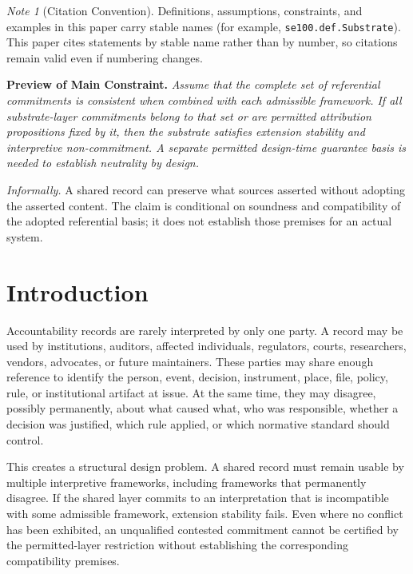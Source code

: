 \documentclass[11pt]{article}
\theoremstyle{plain}
\theoremstyle{definition}
\theoremstyle{remark}
\newtheorem*{note*}{Note}
\begin{document}
\begin{note*}[Citation Convention]
  Definitions, assumptions, constraints, and examples in this paper carry stable
  names (for example, \texttt{se100.def.Substrate}).
  This paper cites statements by stable name rather than by number,
  so citations remain valid even if numbering changes.
\end{note*}


\bigskip
\noindent\textbf{Preview of Main Constraint.}
\emph{
  Assume that the complete set of referential commitments is
  consistent when combined with each admissible framework.
  If all substrate-layer commitments belong to that set or are
  permitted attribution propositions fixed by it, then the
  substrate satisfies extension stability and interpretive
  non-commitment.
  A separate permitted design-time guarantee basis is needed
  to establish neutrality by design.
}

\medskip
\noindent
\emph{Informally.} A shared record can preserve what sources asserted
without adopting the asserted content.
The claim is conditional on soundness and compatibility
of the adopted referential basis;
it does not establish those premises for an actual system.

\section{Introduction}
\label{sec:introduction}

Accountability records are rarely interpreted by only one party.
A record may be used by institutions, auditors, affected individuals,
regulators, courts, researchers, vendors, advocates, or future maintainers.
These parties may share enough reference to identify
the person, event, decision, instrument, place, file, policy, rule,
or institutional artifact at issue.
At the same time, they may disagree, possibly permanently,
about what caused what, who was responsible,
whether a decision was justified, which rule applied,
or which normative standard should control.

This creates a structural design problem.
A shared record must remain usable by multiple interpretive frameworks,
including frameworks that permanently disagree.
If the shared layer commits to an interpretation that is incompatible
with some admissible framework, extension stability fails.
Even where no conflict has been exhibited, an unqualified contested
commitment cannot be certified by the permitted-layer restriction
without establishing the corresponding compatibility premises.
\end{document}
